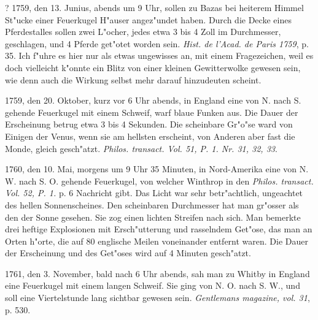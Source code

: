 \documentclass[a4paper, 11pt, oneside, polutonikogreek, german]{article}
\begin{document}
? 1759, den 13. Junius, abends um 9 Uhr, sollen zu Bazas bei heiterem Himmel St"ucke einer Feuerkugel H"auser angez"undet haben. Durch die Decke eines Pferdestalles sollen zwei L"ocher, jedes etwa 3 bis 4 Zoll im Durchmesser, geschlagen, und 4 Pferde get"otet worden sein. \emph{Hist. de l'Acad. de Paris 1759}, p. 35. Ich f"uhre es hier nur als etwas ungewisses an, mit einem Fragezeichen, weil es doch vielleicht k"onnte ein Blitz von einer kleinen Gewitterwolke gewesen sein, wie denn auch die Wirkung selbst mehr darauf hinzudeuten scheint.

1759, den 20. Oktober, kurz vor 6 Uhr abends, in England eine von N. nach S. gehende Feuerkugel mit einem Schweif, warf blaue Funken aus. Die Dauer der Erscheinung betrug etwa 3 bis 4 Sekunden. Die scheinbare Gr"o"se ward von Einigen der Venus, wenn sie am hellsten erscheint, von Anderen aber fast die Monde, gleich gesch"atzt. \emph{Philos. transact. Vol. 51, P. 1. Nr. 31, 32, 33}.

1760, den 10. Mai, morgens um 9 Uhr 35 Minuten, in Nord-Amerika eine von N. W. nach S. O. gehende Feuerkugel, von welcher Winthrop in den \emph{Philos. transact. Vol. 52, P. 1.} p. 6 Nachricht gibt. Das Licht war sehr betr"achtlich, ungeachtet des hellen Sonnenscheines. Den scheinbaren Durchmesser hat man gr"osser als den der Sonne gesehen. Sie zog einen lichten Streifen nach sich. Man bemerkte drei heftige Explosionen mit Ersch"utterung und rasselndem Get"ose, das man an Orten h"orte, die auf 80 englische Meilen voneinander entfernt waren. Die Dauer der Erscheinung und des Get"oses wird auf 4 Minuten gesch"atzt.

1761, den 3. November, bald nach 6 Uhr abends, sah man zu Whitby in England eine Feuerkugel mit einem langen Schweif. Sie ging von N. O. nach S. W., und soll eine Viertelstunde lang sichtbar gewesen sein. \emph{Gentlemans magazine, vol. 31}, p. 530.
\end{document}

